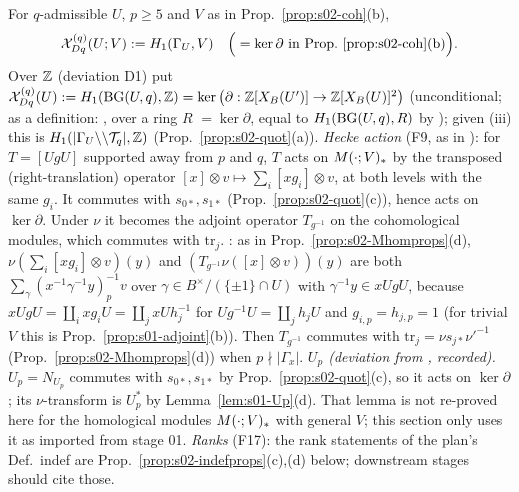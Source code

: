\begin{definition}\label{def:s02-indef}
For $q$-admissible $U$, $p\ge5$ and $V$ as in Prop.~\ref{prop:s02-coh}(b),
\[\cX^{(q)}_{Dq}(U;V):=H_1(\GU,V)\quad\Big(=\ker\partial\ \text{in Prop.~\ref{prop:s02-coh}(b)}\Big).\]
Over $\mathbb{Z}$ (deviation D1) put $\mathcal{X}^{(q)}_{Dq}(U):=H_1(\mathrm{BG}(U,q),\mathbb{Z})=\ker\big(\partial:\mathbb{Z}[X_B(U')]\to\mathbb{Z}[X_B(U)]^2\big)$ (unconditional;
\stformal{} as a definition: , over a ring $R$ 
$=\ker\partial$, equal to $H_1(\mathrm{BG}(U,q),R)$ by );
given (iii) this is $H_1(|\Gamma_U\backslash\backslash\mathcal{T}_q|,\mathbb{Z})$ (Prop.~\ref{prop:s02-quot}(a)).
\emph{Hecke action} (F9, as in ): for $T=[UgU]$ supported away from $p$ and $q$, $T$ acts on $M(\cdot;V)_*$ by the transposed
(right-translation) operator $[x]\otimes v\mapsto\sum_i[xg_i]\otimes v$, at both levels with the same $g_i$. It commutes with $s_{0*},s_{1*}$
(Prop.~\ref{prop:s02-quot}(c)), hence acts on $\ker\partial$. Under $\nu$ it becomes the adjoint operator $T_{g^{-1}}$ on the cohomological modules,
which commutes with $\mathrm{tr}_j$. \stproved: as in Prop.~\ref{prop:s02-Mhomprops}(d), $\nu(\sum_i[xg_i]\otimes v)(y)$ and $(T_{g^{-1}}\nu([x]\otimes v))(y)$ are both
$\sum_\gamma(x^{-1}\gamma^{-1}y)_p^{-1}v$ over $\gamma\in B^\times/(\{\pm1\}\cap U)$ with $\gamma^{-1}y\in xUgU$, because $xUgU=\coprod_ixg_iU=\coprod_jxUh_j^{-1}$ for
$Ug^{-1}U=\coprod_jh_jU$ and $g_{i,p}=h_{j,p}=1$ (for trivial $V$ this is Prop.~\ref{prop:s01-adjoint}(b)). Then $T_{g^{-1}}$ commutes with $\mathrm{tr}_j=\nu s_{j*}\nu'^{-1}$
(Prop.~\ref{prop:s02-Mhomprops}(d)) when $p\nmid|\Gamma_x|$.
\emph{$U_p$ (deviation from , recorded).} $U_p=N_{U_p}$ commutes with $s_{0*},s_{1*}$ by Prop.~\ref{prop:s02-quot}(c), so it acts on
$\ker\partial$; its $\nu$-transform is $U_p^*$ by Lemma~\ref{lem:s01-Up}(d). That lemma is not re-proved here for the homological modules
$M(\cdot;V)_*$ with general $V$; this section only uses it as imported from stage 01.
\emph{Ranks} (F17): the rank statements of the plan's Def.~indef are Prop.~\ref{prop:s02-indefprops}(c),(d) below; downstream stages should cite those.
\end{definition}

